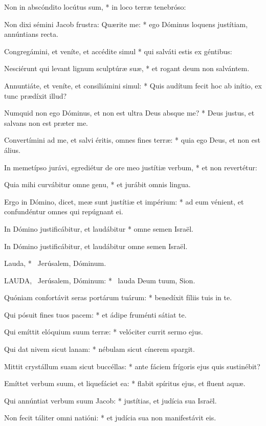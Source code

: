Non in abscóndito locútus sum, * in loco terræ tenebróso:

Non dixi sémini Jacob frustra: Quærite me: * ego Dóminus loquens justítiam, annúntians recta.

Congregámini, et veníte, et accédite simul * qui salváti estis ex géntibus:

Nesciérunt qui levant lignum sculptúræ suæ, * et rogant deum non salvántem.

Annuntiáte, et veníte, et consiliámini simul: * Quis audítum fecit hoc ab inítio, ex tunc prædíxit illud?

Numquid non ego Dóminus, et non est ultra Deus absque me? * Deus justus, et salvans non est præter me.

Convertímini ad me, et salvi éritis, omnes fines terræ: * quia ego Deus, et non est álius.

In memetípso jurávi, egrediétur de ore meo justítiæ verbum, * et non revertétur:

Quia mihi curvábitur omne genu, * et jurábit omnis lingua.

Ergo in Dómino, dicet, meæ sunt justítiæ et impérium: * ad eum vénient, et confundéntur omnes qui repúgnant ei.

In Dómino justificábitur, et laudábitur * omne semen Israël.

 In Dómino justificábitur, et laudábitur omne semen Israël.

 Lauda, * \textdagger\ Jerúsalem, Dóminum. \textdaggerdbl


\lettrine[lines=2]{L}{AUDA}, \textdagger\ Jerúsalem, Dóminum: * \textdaggerdbl\ lauda Deum tuum, Sion.

Quóniam confortávit seras portárum tuárum: * benedíxit fíliis tuis in te.

Qui pósuit fines tuos pacem: * et ádipe fruménti sátiat te.

Qui emíttit elóquium suum terræ: * velóciter currit sermo ejus.

Qui dat nivem sicut lanam: * nébulam sicut cínerem spargit.

Mittit crystállum suam sicut buccéllas: * ante fáciem frígoris ejus quis sustinébit?

Emíttet verbum suum, et liquefáciet ea: * flabit spíritus ejus, et fluent aquæ.

Qui annúntiat verbum suum Jacob: * justítias, et judícia sua Israël.

Non fecit táliter omni natióni: * et judícia sua non manifestávit eis.

